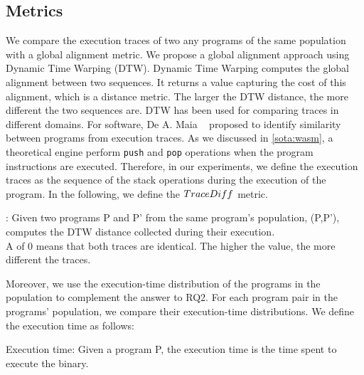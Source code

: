 \subsection*{Metrics}
\label{rq2:metrics}

We compare the execution traces of two any programs of the same population with a global alignment metric. We propose a global alignment approach using Dynamic Time Warping (DTW).
Dynamic Time Warping \cite{NEEDLEMAN1970443} computes the global alignment between two sequences. It returns a value capturing the cost of this alignment, which is a distance metric. The larger the DTW distance, the more different the two sequences are.
DTW has been used for comparing traces in different domains. For software, De A. Maia \etal\ \cite{Maia08usinga} proposed to identify similarity between programs from execution traces.
As we discussed in \autoref{sota:wasm}, a theoretical \wasm engine perform \texttt{push} and \texttt{pop} operations when the program instructions are executed. Therefore, in our experiments, we define the execution traces as the sequence of the stack operations during the execution of the \wasm program. 
In the following, we define the $TraceDiff$ metric. 
 

\begin{metric}{\DTW{}:}
\label{metric:stack}
\normalfont 
	Given two programs P and P' from the same program's population, \DTW{}(P,P'), computes the DTW distance collected during their execution. \\
	A \DTW{} of $0$ means that both traces are identical.
	The higher the value, the more different the traces. 
\end{metric}



Moreover, we use the execution-time distribution of the programs in the population to complement the answer to RQ2. For each program pair in the programs' population, we compare their execution-time distributions. We define the execution time as follows:

\begin{metric}{Execution time:}\label{metric:time}
    \normalfont 
	Given a \wasm program P, the execution time is the time spent to execute the binary.
\end{metric}



